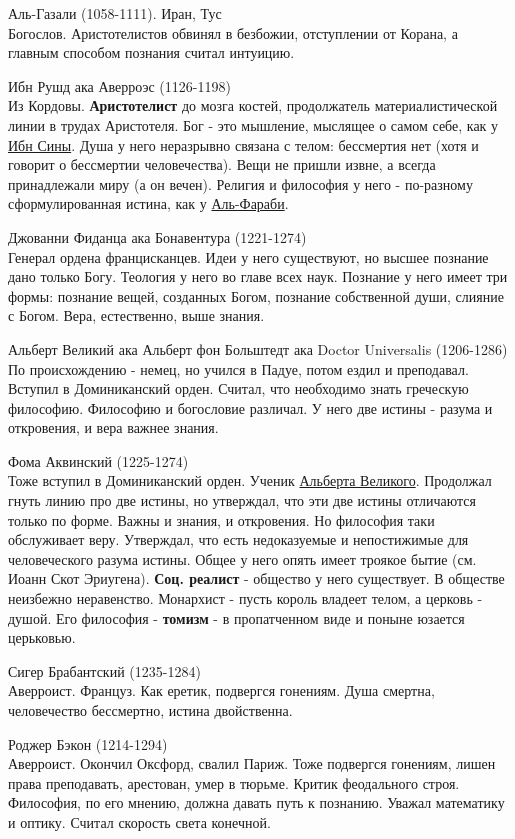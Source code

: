 Аль-Газали (1058-1111). Иран, Тус\\
Богослов. Аристотелистов обвинял в безбожии, отступлении от Корана, а главным способом познания считал интуицию. 

Ибн Рушд ака Аверроэс (1126-1198)\\ 
Из Кордовы. \textbf{Аристотелист} до мозга костей, продолжатель материалистической линии в трудах Аристотеля. Бог - это мышление, мыслящее о самом себе, как у \underline{Ибн Сины}. Душа у него неразрывно связана с телом: бессмертия нет (хотя и говорит о бессмертии человечества). Вещи не пришли извне, а всегда принадлежали миру (а он вечен). Религия и философия у него - по-разному сформулированная истина, как у \underline{Аль-Фараби}.

Джованни Фиданца ака Бонавентура (1221-1274)\\ 
Генерал ордена францисканцев. Идеи у него существуют, но высшее познание дано только Богу. Теология у него во главе всех наук. Познание у него имеет три формы: познание вещей, созданных Богом, познание собственной души, слияние с Богом. Вера, естественно, выше знания.

Альберт Великий  ака Альберт фон Больштедт ака Doctor Universalis (1206-1286)\\
По происхождению - немец, но учился в Падуе, потом ездил и преподавал. Вступил в Доминиканский орден. Считал, что необходимо знать греческую философию. Философию и богословие различал. У него две истины - разума и откровения, и вера важнее знания.

Фома Аквинский (1225-1274)\\
 Тоже вступил в Доминиканский орден. Ученик \underline{Альберта Великого}. Продолжал гнуть линию про две истины, но утверждал, что эти две истины отличаются только по форме. Важны и знания, и откровения. Но философия таки обслуживает веру. Утверждал, что есть недоказуемые и непостижимые для человеческого разума истины. Общее у него опять имеет троякое бытие (см. Иоанн Скот Эриугена). \textbf{Соц. реалист} - общество у него существует. В обществе неизбежно неравенство. Монархист - пусть король владеет телом, а церковь - душой. Его философия - \textbf{томизм} - в пропатченном виде и поныне юзается церьковью.

Сигер Брабантский (1235-1284)\\
Аверроист. Француз. Как еретик, подвергся гонениям. Душа смертна, человечество бессмертно, истина двойственна.
 
Роджер Бэкон (1214-1294)\\ 
Аверроист. Окончил Оксфорд, свалил  Париж. Тоже подвергся гонениям, лишен права преподавать, арестован, умер в тюрьме. Критик феодального строя. Философия, по его мнению, должна давать путь к познанию. Уважал математику и оптику. Считал скорость света конечной.

